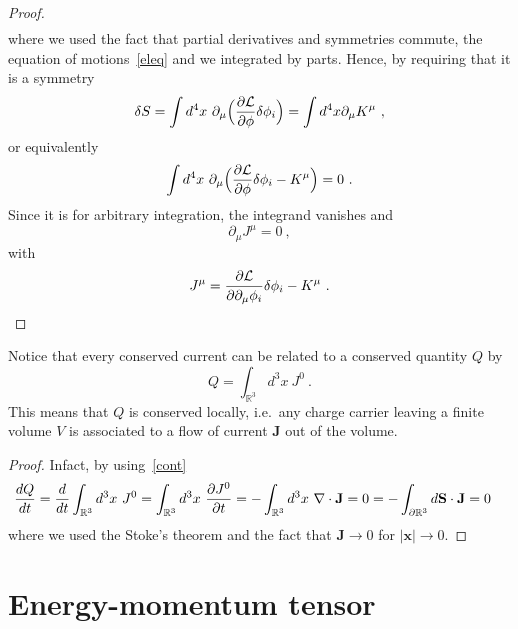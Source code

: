 \begin{proof}
\begin{equation*}
\begin{aligned}
        \end{aligned}
        \end{equation*}
        where we used the fact that partial derivatives and symmetries commute, the equation of motions~\eqref{eleq} and we integrated by parts. Hence, by requiring that it is a symmetry
        \begin{equation*}
            \delta S = \int d^4 x ~ \partial_\mu \Big ( \frac{\partial\mathcal L}{\partial\phi} \delta \phi_i \Big) = \int d^4 x \partial_\mu K^\mu ~,
        \end{equation*}
        or equivalently 
        \begin{equation*}
            \int d^4 x ~ \partial_\mu \Big ( \frac{\partial\mathcal L}{\partial\phi} \delta \phi_i - K^\mu \Big) = 0 ~.
        \end{equation*}
        Since it is for arbitrary integration, the integrand vanishes and 
        \begin{equation*}
            \partial_\mu J^\mu = 0 ~,
        \end{equation*}
        with 
        \begin{equation*}
            J^\mu = \frac{\partial\mathcal L}{\partial\partial_\mu \phi_i} \delta \phi_i - K^\mu ~.
        \end{equation*}
    \end{proof}
    Notice that every conserved current can be related to a conserved quantity $Q$ by 
    \begin{equation*}
        Q = \int_{\mathbb R^3} d^3 x ~J^0 ~.
    \end{equation*}
    This means that $Q$ is conserved locally, i.e.~any charge carrier leaving a finite volume $V$ is associated to a flow of current $\mathbf J$ out of the volume.
    \begin{proof}
        Infact, by using~\eqref{cont}
        \begin{equation*}
        \begin{aligned}
            \frac{dQ}{dt} & = \frac{d}{dt} \int_{\mathbb R^3} d^3 x ~ J^0 = \int_{\mathbb R^3} d^3 x ~ \frac{\partial J^0}{\partial t} = - \int_{\mathbb R^3} d^3 x ~ \nabla \cdot \mathbf J = 0 = -  \int_{\partial \mathbb R^3} d \mathbf S \cdot \mathbf J = 0
        \end{aligned}
        \end{equation*}
        where we used the Stoke's theorem and the fact that $\mathbf J \rightarrow 0$ for $|\mathbf x| \rightarrow 0$.
    \end{proof}

\section{Energy-momentum tensor}

